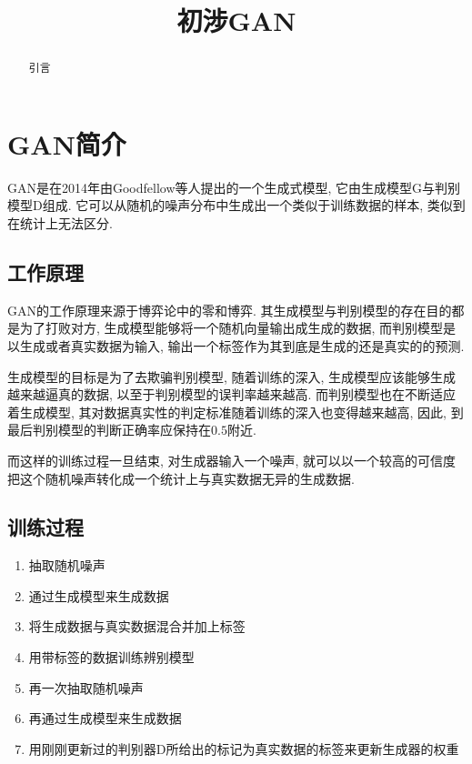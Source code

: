 \documentclass[lang=cn,11pt]{elegantpaper}
\title{初涉GAN}
\date{}
\begin{document}
\maketitle

\begin{abstract}
\noindent 引言
\end{abstract}
\tableofcontents
\newpage
\section{GAN简介}

GAN是在2014年由Goodfellow等人提出的一个生成式模型, 它由生成模型G与判别模型D组成. 它可以从随机的噪声分布中生成出一个类似于训练数据的样本, 类似到在统计上无法区分. 

\subsection{工作原理}

GAN的工作原理来源于博弈论中的零和博弈. 其生成模型与判别模型的存在目的都是为了打败对方, 生成模型能够将一个随机向量输出成生成的数据, 而判别模型是以生成或者真实数据为输入, 输出一个标签作为其到底是生成的还是真实的的预测.

生成模型的目标是为了去欺骗判别模型, 随着训练的深入, 生成模型应该能够生成越来越逼真的数据, 以至于判别模型的误判率越来越高. 而判别模型也在不断适应着生成模型, 其对数据真实性的判定标准随着训练的深入也变得越来越高, 因此, 到最后判别模型的判断正确率应保持在$0.5$附近. 

而这样的训练过程一旦结束, 对生成器输入一个噪声, 就可以以一个较高的可信度把这个随机噪声转化成一个统计上与真实数据无异的生成数据. 

\subsection{训练过程}
\begin{enumerate}

  \item 抽取随机噪声
  \item 通过生成模型来生成数据
  \item 将生成数据与真实数据混合并加上标签
  \item 用带标签的数据训练辨别模型
  \item 再一次抽取随机噪声
  \item 再通过生成模型来生成数据
  \item 用刚刚更新过的判别器D所给出的标记为真实数据的标签来更新生成器的权重
\end{enumerate}
\end{document}
